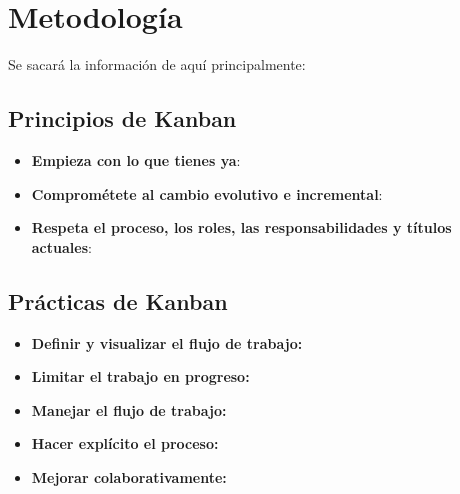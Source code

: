 \section{Metodología}\label{sec:metodologia}


Se sacará la información de aquí principalmente:
\cite{Cole2015-fd} %
\cite{Stellman2014-qr} %

\subsection{Principios de Kanban}
\begin{itemize}
    \item \textbf{Empieza con lo que tienes ya}: %
    \item \textbf{Comprométete al cambio evolutivo e incremental}: %
    \item \textbf{Respeta el proceso, los roles, las responsabilidades y títulos actuales}: %
\end{itemize}

\subsection{Prácticas de Kanban}
\begin{itemize}
    \item \textbf{Definir y visualizar el flujo de trabajo:} %
    \item \textbf{Limitar el trabajo en progreso:} %
    \item \textbf{Manejar el flujo de trabajo:} %
    \item \textbf{Hacer explícito el proceso:} %
    \item \textbf{Mejorar colaborativamente:} %
\end{itemize}


